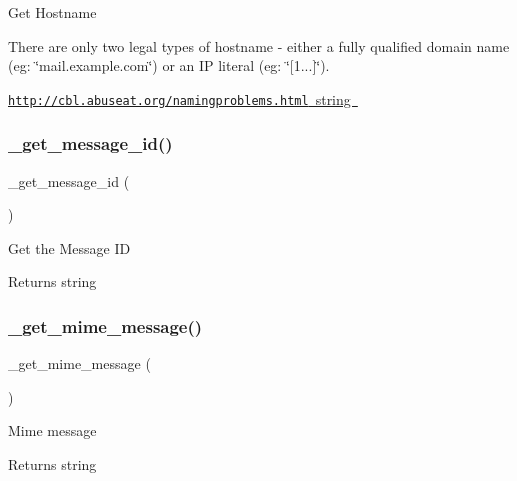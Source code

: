 Get Hostname

There are only two legal types of hostname -\/ either a fully qualified domain name (eg\+: \char`\"{}mail.\+example.\+com\char`\"{}) or an IP literal (eg\+: \char`\"{}\mbox{[}1...\mbox{]}\char`\"{}).

\mbox{\hyperlink{}{\href{http://cbl.abuseat.org/namingproblems.html}{\tt http\+://cbl.\+abuseat.\+org/namingproblems.\+html}  string }}\mbox{\label{class_c_i___email_a253c34263736465755f85ec4192aa6b4}} 
\subsubsection{\texorpdfstring{\+\_\+get\+\_\+message\+\_\+id()}{\_get\_message\_id()}}
{\footnotesize\ttfamily \+\_\+get\+\_\+message\+\_\+id (\begin{DoxyParamCaption}{ }\end{DoxyParamCaption})\hspace{0.3cm}{\ttfamily [protected]}}

Get the Message ID

\begin{DoxyReturn}{Returns}
string 
\end{DoxyReturn}
\mbox{\label{class_c_i___email_a2211ba669bd8d076041d4e72bc8a9c59}} 
\subsubsection{\texorpdfstring{\+\_\+get\+\_\+mime\+\_\+message()}{\_get\_mime\_message()}}
{\footnotesize\ttfamily \+\_\+get\+\_\+mime\+\_\+message (\begin{DoxyParamCaption}{ }\end{DoxyParamCaption})\hspace{0.3cm}{\ttfamily [protected]}}

Mime message

\begin{DoxyReturn}{Returns}
string 
\end{DoxyReturn}
\mbox{\label{class_c_i___email_ad0000c693b4b2768f56fcc1049f8b3c7}} 
